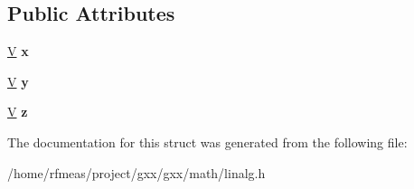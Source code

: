 \subsection*{Public Attributes}
\begin{DoxyCompactItemize}
\item 
\hyperlink{structlinalg_1_1vec}{V} {\bfseries x}\hypertarget{structlinalg_1_1mat_3_01T_00_01M_00_013_01_4_a7ab564bd47e9add70e3fc8d74202b09c}{}\label{structlinalg_1_1mat_3_01T_00_01M_00_013_01_4_a7ab564bd47e9add70e3fc8d74202b09c}

\item 
\hyperlink{structlinalg_1_1vec}{V} {\bfseries y}\hypertarget{structlinalg_1_1mat_3_01T_00_01M_00_013_01_4_a9401b8450f826c272d539720ebe1f231}{}\label{structlinalg_1_1mat_3_01T_00_01M_00_013_01_4_a9401b8450f826c272d539720ebe1f231}

\item 
\hyperlink{structlinalg_1_1vec}{V} {\bfseries z}\hypertarget{structlinalg_1_1mat_3_01T_00_01M_00_013_01_4_ad281992b19e591f5ac157236b86615b0}{}\label{structlinalg_1_1mat_3_01T_00_01M_00_013_01_4_ad281992b19e591f5ac157236b86615b0}

\end{DoxyCompactItemize}


The documentation for this struct was generated from the following file\+:\begin{DoxyCompactItemize}
\item 
/home/rfmeas/project/gxx/gxx/math/linalg.\+h\end{DoxyCompactItemize}
